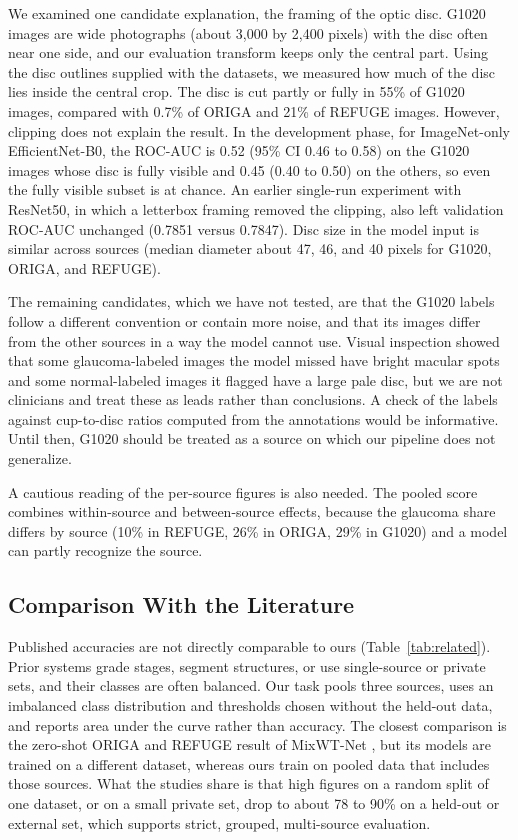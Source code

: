 We examined one candidate explanation, the framing of the optic disc. G1020 images are wide photographs (about 3,000 by 2,400 pixels) with the disc often near one side, and our evaluation transform keeps only the central part. Using the disc outlines supplied with the datasets, we measured how much of the disc lies inside the central crop. The disc is cut partly or fully in 55\% of G1020 images, compared with 0.7\% of ORIGA and 21\% of REFUGE images. However, clipping does not explain the result. In the development phase, for ImageNet-only EfficientNet-B0, the ROC-AUC is 0.52 (95\% CI 0.46 to 0.58) on the G1020 images whose disc is fully visible and 0.45 (0.40 to 0.50) on the others, so even the fully visible subset is at chance. An earlier single-run experiment with ResNet50, in which a letterbox framing removed the clipping, also left validation ROC-AUC unchanged (0.7851 versus 0.7847). Disc size in the model input is similar across sources (median diameter about 47, 46, and 40 pixels for G1020, ORIGA, and REFUGE).

The remaining candidates, which we have not tested, are that the G1020 labels follow a different convention or contain more noise, and that its images differ from the other sources in a way the model cannot use. Visual inspection showed that some glaucoma-labeled images the model missed have bright macular spots and some normal-labeled images it flagged have a large pale disc, but we are not clinicians and treat these as leads rather than conclusions. A check of the labels against cup-to-disc ratios computed from the annotations would be informative. Until then, G1020 should be treated as a source on which our pipeline does not generalize.

A cautious reading of the per-source figures is also needed. The pooled score combines within-source and between-source effects, because the glaucoma share differs by source (10\% in REFUGE, 26\% in ORIGA, 29\% in G1020) and a model can partly recognize the source.

\subsection{Comparison With the Literature}
Published accuracies are not directly comparable to ours (Table~\ref{tab:related}). Prior systems grade stages, segment structures, or use single-source or private sets, and their classes are often balanced. Our task pools three sources, uses an imbalanced class distribution and thresholds chosen without the held-out data, and reports area under the curve rather than accuracy. The closest comparison is the zero-shot ORIGA and REFUGE result of MixWT-Net \cite{das2026}, but its models are trained on a different dataset, whereas ours train on pooled data that includes those sources. What the studies share is that high figures on a random split of one dataset, or on a small private set, drop to about 78 to 90\% on a held-out or external set, which supports strict, grouped, multi-source evaluation.

